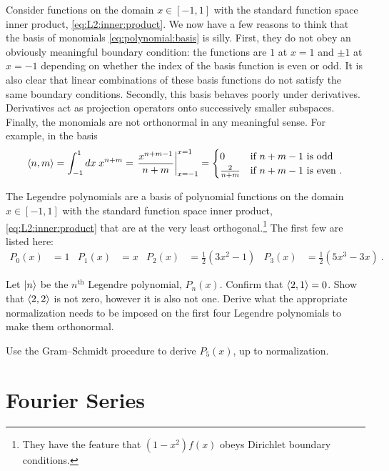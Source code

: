 \documentclass[12pt, oneside]{report}    %
\let\oldsection\section
\def\section{%
  \setcounter{sidenote}{1}%
  \oldsection
}
\begin{document}
Consider functions on the domain $x\in[-1,1]$ with the standard function space inner product, \eqref{eq:L2:inner:product}. We now have a few reasons to think that the basis of monomials \eqref{eq:polynomial:basis} is silly. First, they do not obey an obviously meaningful boundary condition: the functions are $1$ at $x=1$  and $\pm 1$ at $x=-1$ depending on whether the index of the basis function is even or odd. It is also clear that linear combinations of these basis functions do not satisfy the same boundary conditions. Secondly, this basis behaves poorly under derivatives. Derivatives act as projection operators onto successively smaller subspaces. Finally, the monomials are not orthonormal in any meaningful sense. For example,  in the basis
\begin{align}
    \langle n, m \rangle  = \int_{-1}^1 dx\; x^{n+m} = \left.\frac{x^{n+m-1}}{n+m}\right|^{x=1}_{x=-1}
    =
    \begin{cases}
    0 & \textnormal{if } n+m-1 \textnormal { is odd}
    \\
    \frac{2}{n+m} & \textnormal{if } n+m-1 \textnormal { is even} \ .
    \end{cases}
\end{align}

The Legendre polynomials are a basis of polynomial functions on the domain $x\in[-1,1]$ with the standard function space inner product, \eqref{eq:L2:inner:product} that are at the very least orthogonal.\footnote{They have the feature that $(1-x^2)f(x)$ obeys Dirichlet boundary conditions.} The first few are listed here:
\begin{align}
    P_0(x) &= 1
    &
    P_1(x) &= x
    &
    P_2(x) &= \frac{1}{2}(3x^2-1)
    &
    P_3(x) &= \frac{1}{2}(5x^3-3x) \ .
\end{align}
\begin{exercise}
Let $\left|n\right\rangle$ be the $n^\text{th}$ Legendre polynomial, $P_n(x)$.
Confirm that $\langle 2, 1 \rangle = 0$. Show that $\langle 2, 2 \rangle$ is not zero, however it is also not one. Derive what the appropriate normalization needs to be imposed on the first four Legendre polynomials to make them orthonormal. 
\end{exercise}
\begin{exercise}
Use the Gram--Schmidt procedure to derive $P_5(x)$, up to normalization. 
\end{exercise}




\section{Fourier Series}
\end{document}

